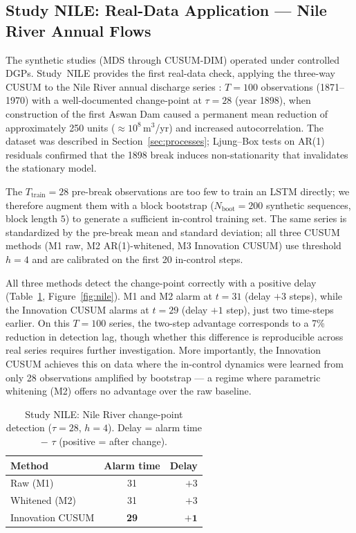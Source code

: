 \documentclass[bj,authoryear]{imsart}
\theoremstyle{plain}
\theoremstyle{definition}
\begin{document}
\subsection{Study NILE: Real-Data Application --- Nile River Annual Flows}
\label{sec:nile}

The synthetic studies (MDS through CUSUM-DIM) operated under controlled DGPs.
Study~NILE provides the first real-data check, applying the three-way CUSUM to
the Nile River annual discharge series \citep{cobb1978problem}: $T=100$
observations (1871--1970) with a well-documented change-point at $\tau=28$
(year 1898), when construction of the first Aswan Dam caused a permanent
mean reduction of approximately 250 units ($\approx10^8$\,m$^3$/yr) and
increased autocorrelation.
The dataset was described in Section~\ref{sec:processes}; Ljung--Box tests
on AR(1) residuals confirmed that the 1898 break induces non-stationarity
that invalidates the stationary model.

The $T_{\mathrm{train}}=28$ pre-break observations are too few to train an
LSTM directly; we therefore augment them with a block bootstrap
($N_{\mathrm{boot}}=200$ synthetic sequences, block length $5$) to generate
a sufficient in-control training set.
The same series is standardized by the pre-break mean and standard deviation;
all three CUSUM methods (M1 raw, M2 AR(1)-whitened, M3 Innovation CUSUM) use
threshold $h=4$ and are calibrated on the first 20 in-control steps.

All three methods detect the change-point correctly with a positive delay
(Table~\ref{tab:nile}, Figure~\ref{fig:nile}).
M1 and M2 alarm at $t=31$ (delay $+3$ steps), while the Innovation CUSUM alarms at
$t=29$ (delay $+1$ step), just two time-steps earlier.
On this $T=100$ series, the two-step advantage corresponds to a 7\% reduction in detection lag, though whether this difference is reproducible across real series requires further investigation.
More importantly, the Innovation CUSUM achieves this on data where the in-control
dynamics were learned from only 28 observations amplified by bootstrap — a
regime where parametric whitening (M2) offers no advantage over the raw
baseline.

\begin{table}[h]
\centering
\caption{Study NILE: Nile River change-point detection ($\tau=28$, $h=4$).
  Delay = alarm time $-$ $\tau$ (positive = after change).}
\label{tab:nile}
\small
\begin{tabular}{lcr}
\toprule
Method & Alarm time & Delay \\
\midrule
Raw (M1)      & 31 & $+3$ \\
Whitened (M2) & 31 & $+3$ \\
Innovation CUSUM     & \textbf{29} & $\mathbf{+1}$ \\
\bottomrule
\end{tabular}
\end{table}
\end{document}
